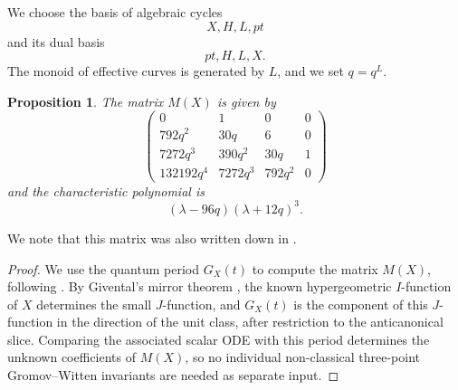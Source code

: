 \documentclass[11pt]{amsart}
\theoremstyle{plain}
\newtheorem{proposition}[theorem]{Proposition}
\numberwithin{equation}{section}
\theoremstyle{definition}
\theoremstyle{remark}
\begin{document}
We choose the basis of algebraic cycles
\[X,H,L,pt\] 
and its dual basis
\[pt, H, L, X.\]
The monoid of effective curves is generated by $L$, and we set $q = q^L$.
\begin{proposition}
    The matrix $M(X)$ is given by 
    \[
    \begin{pmatrix}
        0 & 1 & 0 & 0\\
        792q^2 & 30q & 6 & 0\\
        7272q^3 & 390q^2 & 30q & 1\\
        132192q^4 & 7272q^3 & 792q^2 & 0
    \end{pmatrix}
    \]
    and the characteristic polynomial is
    \[
    (\lambda-96q)(\lambda+12q)^3.
    \]
\end{proposition}
We note that this matrix was also written down in \cite{Pr06}.
\begin{proof}


    We use the quantum period \(G_X(t)\) to compute the matrix \(M(X)\), following
\cite{Fay26}. By Givental's mirror theorem \cite{Giv96}, the known
hypergeometric \(I\)-function of \(X\) determines the small \(J\)-function, and
\(G_X(t)\) is the component of this \(J\)-function in the direction of the unit
class, after restriction to the anticanonical slice. Comparing the associated scalar ODE
with this period determines the unknown coefficients of \(M(X)\), so no
individual non-classical three-point Gromov--Witten invariants are needed as
separate input.

    

    
    

\end{proof}
\end{document}
